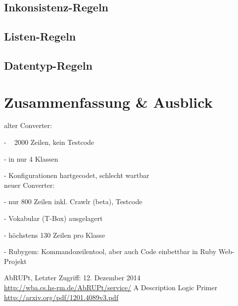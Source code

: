 \documentclass[runningheads,a4paper]{llncs}
\begin{document}
\subsection{Inkonsistenz-Regeln}
\subsection{Listen-Regeln}
\subsection{Datentyp-Regeln}

\section{Zusammenfassung \& Ausblick}
alter Converter:

- ~ 2000 Zeilen, kein Testcode

- in nur 4 Klassen

- Konfigurationen hartgecodet, schlecht wartbar
\\
neuer Converter:

- nur 800 Zeilen inkl. Crawlr (beta), Testcode

- Vokabular (T-Box) ausgelagert

- höchstens 130 Zeilen pro Klasse

- Rubygem: Kommandozeilentool, aber auch Code einbettbar in Ruby Web-Projekt





\begin{thebibliography}{4}

AbRUPt,
Letzter Zugriff: 12. Dezember 2014\\
\url{http://wba.cs.hs-rm.de/AbRUPt/service/}
A Description Logic Primer\\
\url{http://arxiv.org/pdf/1201.4089v3.pdf}

\end{thebibliography}
\end{document}

